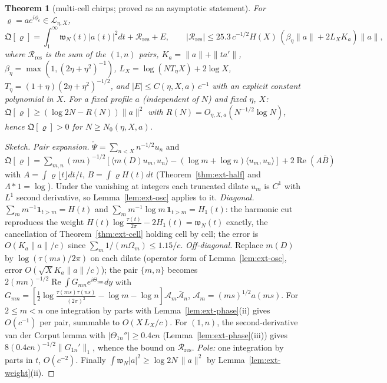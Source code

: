\documentclass[11pt]{amsart}
\newtheorem{theorem}{Theorem}[section]
\theoremstyle{definition}
\theoremstyle{remark}
\newcommand{\Rel}{\operatorname{Re}}
\begin{document}
\begin{theorem}[multi-cell chirps; proved as an asymptotic statement]\label{thm:ext-multi}
For $\varrho=ae^{i\phi_c}\in\mathcal L_{\eta,X}$,
\[
\mathfrak Q[\varrho]=\int_1^\infty\mathfrak w_N(t)|a(t)|^2dt+\mathcal R_{\mathrm{res}}+E,\qquad
|\mathcal R_{\mathrm{res}}|\le25.3\,c^{-1/2}H(X)\,(\beta_\eta\|a\|+2L_XK_a)\|a\|,
\]
where $\mathcal R_{\mathrm{res}}$ is the sum of the $(1,n)$ pairs, $K_a=\|a\|+\|ta'\|$, $\beta_\eta=\max(1,(2\eta+\eta^2)^{-1})$,
$L_X=\log(NT_\eta X)+2\log X$, $T_\eta=(1+\eta)(2\eta+\eta^2)^{-1/2}$, and $|E|\le C(\eta,X,a)\,c^{-1}$ with an explicit constant
polynomial in $X$. For a fixed profile $a$ (independent of $N$) and fixed $\eta$, $X$:
$\mathfrak Q[\varrho]\ge(\log2N-R(N))\|a\|^2$ with $R(N)=O_{\eta,X,a}(N^{-1/2}\log N)$, hence $\mathfrak Q[\varrho]>0$ for
$N\ge N_0(\eta,X,a)$.
\end{theorem}
\begin{proof}[Sketch]
\emph{Pair expansion.} $\check\Psi=\sum_{n<X}n^{-1/2}u_n$ and
$\mathfrak Q[\varrho]=\sum_{m,n}(mn)^{-1/2}[\langle m(D)u_m,u_n\rangle-(\log m+\log n)\langle u_m,u_n\rangle]+2\Rel(A\bar B)$ with
$A=\int\varrho\lfloor t\rfloor dt/t$, $B=\int\varrho H(t)dt$ (Theorem~\ref{thm:ext-half} and $\Lambda*1=\log$). Under the vanishing at
integers each truncated dilate $u_m$ is $C^1$ with $L^1$ second derivative, so Lemma~\ref{lem:ext-osc} applies to it.
\emph{Diagonal.} $\sum_mm^{-1}\mathbf 1_{t>m}=H(t)$ and $\sum_mm^{-1}\log m\,\mathbf 1_{t>m}=H_1(t)$: the harmonic cut reproduces the
weight $H(t)\log\frac{\tau(t)}{2\pi}-2H_1(t)=\mathfrak w_N(t)$ exactly, the cancellation of Theorem~\ref{thm:ext-cell} holding cell by
cell; the error is $O(K_a\|a\|/c)$ since $\sum_m1/(m\Omega_m)\le1.15/c$. \emph{Off-diagonal.} Replace $m(D)$ by $\log(\tau(ms)/2\pi)$
on each dilate (operator form of Lemma~\ref{lem:ext-osc}, error $O(\sqrt X K_a\|a\|/c)$); the pair $\{m,n\}$ becomes
$2(mn)^{-1/2}\Rel\int G_{mn}e^{i\Theta_{mn}}dy$ with
$G_{mn}=[\frac12\log\frac{\tau(ms)\tau(ns)}{(2\pi)^2}-\log m-\log n]\mathcal A_m\bar{\mathcal A}_n$, $\mathcal A_m=(ms)^{1/2}a(ms)$.
For $2\le m<n$ one integration by parts with Lemma~\ref{lem:ext-phase}(ii) gives $O(c^{-1})$ per pair, summable to $O(X\,L_X/c)$.
For $(1,n)$, the second-derivative van der Corput lemma \cite[Ch.~VIII, \S1.2]{Stein1993} with $|\Theta_{1n}''|\ge0.4cn$
(Lemma~\ref{lem:ext-phase}(iii)) gives $8(0.4cn)^{-1/2}\|G_{1n}'\|_1$, whence the bound on $\mathcal R_{\mathrm{res}}$. \emph{Pole:}
one integration by parts in $t$, $O(c^{-2})$. Finally $\int\mathfrak w_N|a|^2\ge\log2N\,\|a\|^2$ by Lemma~\ref{lem:ext-weight}(ii).
\end{proof}
\end{document}
